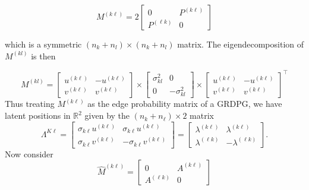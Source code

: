 \documentclass[12pt]{article}
\begin{document}
\[M^{(k \ell)} = 2 \begin{bmatrix} 0 & P^{(k \ell)} \\ P^{(\ell k)} & 0 \end{bmatrix}\]

which is a symmetric \((n_k + n_l) \times (n_k + n_l)\) matrix. The
eigendecomposition of \(M^{(kl)}\) is then

\[M^{(kl)} = 
\begin{bmatrix} u^{(k \ell)} & -u^{(k \ell)} \\ v^{(k \ell)} & v^{(k \ell)} \end{bmatrix} \times 
\begin{bmatrix} \sigma^2_{kl} & 0 \\ 0 & -\sigma^2_{kl} \end{bmatrix} \times
\begin{bmatrix} u^{(k \ell)} & -u^{(k \ell)} \\ v^{(k \ell)} & v^{(k \ell)} \end{bmatrix}^\top\]
Thus treating \(M^{(k \ell)}\) as the edge probability matrix of a GRDPG, we
have latent positions in \(\mathbb{R}^2\) given by the $(n_k + n_{\ell}) \times 2$ matrix
\[\Lambda^{K \ell} = \begin{bmatrix} 
  \sigma_{k \ell} u^{(k \ell)} & \sigma_{k \ell} u^{(k \ell)} \\ 
  \sigma_{k \ell} v^{(k \ell)} & -\sigma_{k \ell} v^{(k \ell)} 
\end{bmatrix} = 
\begin{bmatrix} 
  \lambda^{(k \ell)} & \lambda^{(k \ell)} \\ 
  \lambda^{( \ell k)} & -\lambda^{( \ell k)} 
\end{bmatrix}.\]
Now consider
\[\hat{M}^{(k \ell)} = \begin{bmatrix} 0 & A^{(k \ell)} \\ A^{(\ell k)} & 0 \end{bmatrix}\]

\end{document}
